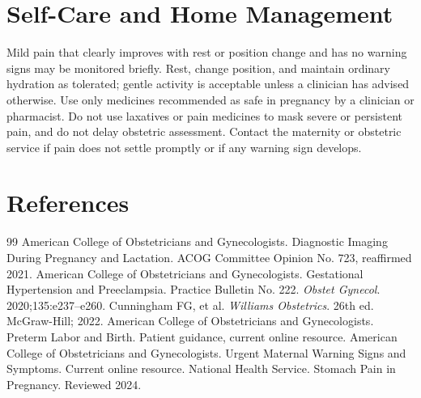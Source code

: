 \section*{Self-Care and Home Management}
Mild pain that clearly improves with rest or position change and has no warning signs may be monitored briefly. Rest, change position, and maintain ordinary hydration as tolerated; gentle activity is acceptable unless a clinician has advised otherwise. Use only medicines recommended as safe in pregnancy by a clinician or pharmacist. Do not use laxatives or pain medicines to mask severe or persistent pain, and do not delay obstetric assessment. Contact the maternity or obstetric service if pain does not settle promptly or if any warning sign develops.

\section*{References}
\begin{thebibliography}{99}
 American College of Obstetricians and Gynecologists. Diagnostic Imaging During Pregnancy and Lactation. ACOG Committee Opinion No. 723, reaffirmed 2021.
 American College of Obstetricians and Gynecologists. Gestational Hypertension and Preeclampsia. Practice Bulletin No. 222. \textit{Obstet Gynecol}. 2020;135:e237--e260.
 Cunningham FG, et al. \textit{Williams Obstetrics}. 26th ed. McGraw-Hill; 2022.
 American College of Obstetricians and Gynecologists. Preterm Labor and Birth. Patient guidance, current online resource.
 American College of Obstetricians and Gynecologists. Urgent Maternal Warning Signs and Symptoms. Current online resource.
 National Health Service. Stomach Pain in Pregnancy. Reviewed 2024.
\end{thebibliography}
